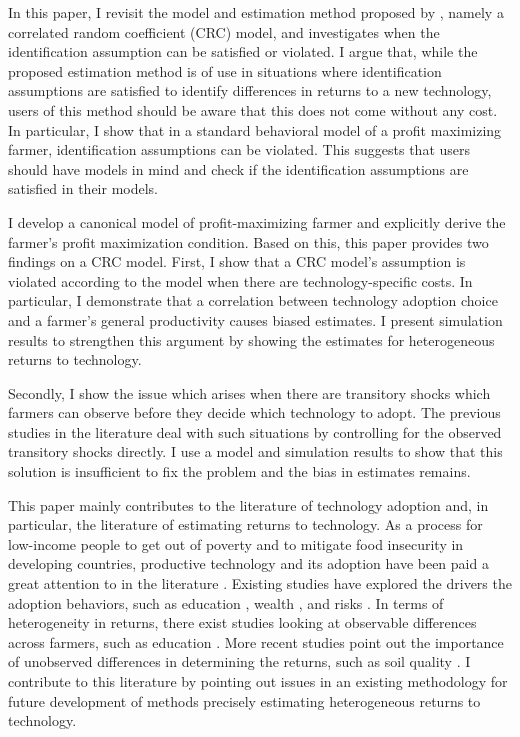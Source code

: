 \documentclass[11pt,letterpaper]{article}
\begin{document}
In this paper, I revisit the model and estimation method proposed by \cite{Suri11}, namely a correlated random coefficient (CRC) model, and investigates when the identification assumption can be satisfied or violated.
I argue that, while the proposed estimation method is of use in situations where identification assumptions are satisfied to identify differences in returns to a new technology, users of this method should be aware that this does not come without any cost.
In particular, I show that in a standard behavioral model of a profit maximizing farmer, identification assumptions can be violated.
This suggests that users should have models in mind and check if the identification assumptions are satisfied in their models.

I develop a canonical model of profit-maximizing farmer and explicitly derive the farmer's profit maximization condition.
Based on this, this paper provides two findings on a CRC model.
First, I show that a CRC model's assumption is violated according to the model when there are technology-specific costs.
In particular, I demonstrate that a correlation between technology adoption choice and a farmer's general productivity causes biased estimates.
I present simulation results to strengthen this argument by showing the estimates for heterogeneous returns to technology.

Secondly, I show the issue which arises when there are transitory shocks which farmers can observe before they decide which technology to adopt.
The previous studies in the literature deal with such situations by controlling for the observed transitory shocks directly.
I use a model and simulation results to show that this solution is insufficient to fix the problem and the bias in estimates remains.

This paper mainly contributes to the literature of technology adoption and, in particular, the literature of estimating returns to technology.
As a process for low-income people to get out of poverty and to mitigate food insecurity in developing countries, productive technology and its adoption have been paid a great attention to in the literature \citep{feder1985adoption}.
Existing studies have explored the drivers the adoption behaviors, such as education \citep{weir2000adoption}, wealth \citep{moser2006complex}, and risks \citep{dercon2011consumption}.
In terms of heterogeneity in returns, there exist studies looking at observable differences across farmers, such as education \citep{foster1996technical}.
More recent studies point out the importance of unobserved differences in determining the returns, such as soil quality \citep{munshi2004social, foster2010microeconomics}.
I contribute to this literature by pointing out issues in an existing methodology for future development of methods precisely estimating heterogeneous returns to technology.
\end{document}
